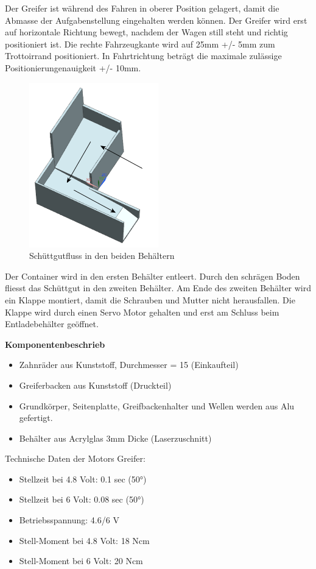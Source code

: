 Der Greifer ist während des Fahren in oberer Position gelagert, damit die Abmasse der Aufgabenstellung eingehalten werden können. Der Greifer wird erst auf horizontale Richtung bewegt, nachdem der Wagen still steht und richtig positioniert ist.
Die rechte Fahrzeugkante wird auf 25mm +/- 5mm zum Trottoirrand positioniert. In Fahrtrichtung beträgt die maximale zulässige Positionierungenauigkeit +/- 10mm.

\begin{figure}[H]
\centering
\includegraphics[width=0.5\textwidth]{03_Loesungskonzept/pictures/behaelter.png}
\caption{Schüttgutfluss in den beiden Behältern}
\end{figure}

Der Container wird in den ersten Behälter entleert. Durch den schrägen Boden fliesst das Schüttgut in den zweiten Behälter. Am Ende des zweiten Behälter wird ein Klappe montiert, damit die Schrauben und Mutter nicht herausfallen. Die Klappe wird durch einen Servo Motor gehalten und erst am Schluss beim Entladebehälter geöffnet.

\textbf{Komponentenbeschrieb}
\begin{itemize}
\item Zahnräder aus Kunststoff, Durchmesser = 15 (Einkaufteil)
\item Greiferbacken aus Kunststoff (Druckteil)
\item Grundkörper, Seitenplatte, Greifbackenhalter und Wellen werden aus Alu gefertigt.
\item Behälter aus Acrylglas 3mm Dicke (Laserzuschnitt)
\end{itemize}

Technische Daten der Motors Greifer:
\begin{itemize}
\item Stellzeit bei 4.8 Volt: 0.1 sec (50°) 
\item Stellzeit bei 6 Volt: 0.08 sec (50°) 
\item Betriebsspannung: 4.6/6 V
\item Stell-Moment bei 4.8 Volt: 18 Ncm
\item Stell-Moment bei 6 Volt: 20 Ncm 
\end{itemize}

